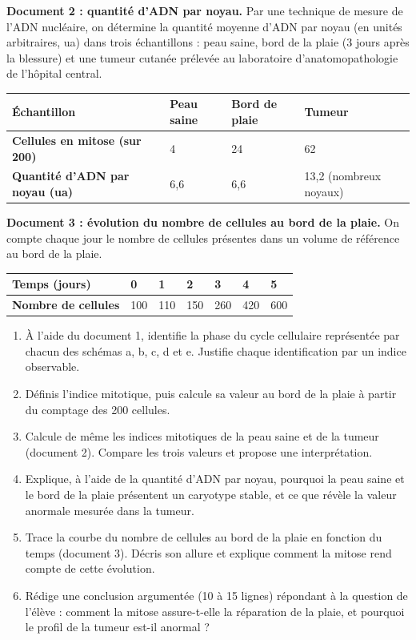 \documentclass[11pt]{article}
\newcommand{\cle}[1]{{\popxbold\color{popdark}#1}}
\newcounter{popsec}
\newcounter{popsub}
\newcommand{\courssub}[1]{%
  \stepcounter{popsub}%
  \par\vspace{9pt}\noindent{\popxbold\fontsize{11.5}{13}\selectfont\color{popink}{\color{poporange}\thepopsec.\thepopsub}\hspace{6pt}#1}\par\nopagebreak\vspace{4pt}
}
\begin{document}
\textbf{Document 2 : quantité d'ADN par noyau.} Par une technique de mesure de l'ADN nucléaire, on détermine la quantité moyenne d'ADN par noyau (en unités arbitraires, ua) dans trois échantillons : peau saine, bord de la plaie (3 jours après la blessure) et une tumeur cutanée prélevée au laboratoire d'anatomopathologie de l'hôpital central.

\begin{center}
\begin{tabularx}{\linewidth}{|l|X|X|X|}
\hline
\rowcolor{popblueL} \textbf{Échantillon} & Peau saine & Bord de plaie & Tumeur \\
\hline
\textbf{Cellules en mitose (sur 200)} & 4 & 24 & 62 \\
\hline
\textbf{Quantité d'ADN par noyau (ua)} & 6,6 & 6,6 & 13,2 (nombreux noyaux) \\
\hline
\end{tabularx}
\end{center}

\textbf{Document 3 : évolution du nombre de cellules au bord de la plaie.} On compte chaque jour le nombre de cellules présentes dans un volume de référence au bord de la plaie.

\begin{center}
\begin{tabularx}{\linewidth}{|l|X|X|X|X|X|X|}
\hline
\rowcolor{popblueL} \textbf{Temps (jours)} & 0 & 1 & 2 & 3 & 4 & 5 \\
\hline
\textbf{Nombre de cellules} & 100 & 110 & 150 & 260 & 420 & 600 \\
\hline
\end{tabularx}
\end{center}

\courssub{Consignes}

\begin{enumerate}
\item À l'aide du document 1, identifie la phase du cycle cellulaire représentée par chacun des schémas a, b, c, d et e. Justifie chaque identification par un indice observable.
\item Définis l'\cle{indice mitotique}, puis calcule sa valeur au bord de la plaie à partir du comptage des 200 cellules.
\item Calcule de même les indices mitotiques de la peau saine et de la tumeur (document 2). Compare les trois valeurs et propose une interprétation.
\item Explique, à l'aide de la quantité d'ADN par noyau, pourquoi la peau saine et le bord de la plaie présentent un caryotype stable, et ce que révèle la valeur anormale mesurée dans la tumeur.
\item Trace la courbe du nombre de cellules au bord de la plaie en fonction du temps (document 3). Décris son allure et explique comment la mitose rend compte de cette évolution.
\item Rédige une conclusion argumentée (10 à 15 lignes) répondant à la question de l'élève : comment la mitose assure-t-elle la réparation de la plaie, et pourquoi le profil de la tumeur est-il anormal ?
\end{enumerate}
\end{document}
